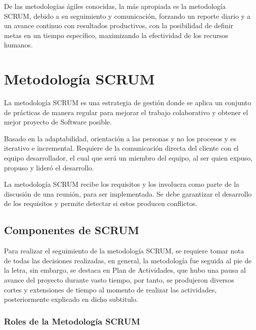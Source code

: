 De las metodologías ágiles conocidas, la más apropiada es la metodología SCRUM, debido a su seguimiento y comunicación, forzando un reporte diario y a un avance continuo con resultados productivos, con la posibilidad de definir metas en un tiempo específico, maximizando la efectividad de los recursos humanos.

\section{Metodología SCRUM}

La metodología SCRUM es una estrategia de gestión donde se aplica un conjunto de prácticas de manera regular para mejorar el trabajo colaborativo y obtener el mejor proyecto de Software posible\cite{scrumdiapo}.

Basado en la adaptabilidad, orientación a las personas y no los procesos y es iterativo e incremental. Requiere de la comunicación directa del cliente con el equipo desarrollador, el cual que será un miembro del equipo, al ser quien expuso, propuso y lideró el desarrollo.

La metodología SCRUM recibe los requisitos y los involucra como parte de la discusión de una reunión, para ser implementada. Se debe garantizar el desarrollo de los requisitos y permite detectar si estos producen conflictos.

\subsection{Componentes de SCRUM}

Para realizar el seguimiento de la metodología SCRUM, se requiere tomar nota de todas las decisiones realizadas, en general, la metodología fue seguida al pie de la letra, sin embargo, se destaca en Plan de Actividades, que hubo una pausa al avance del proyecto durante vasto tiempo, por tanto, se produjeron diversos cortes y extensiones de tiempo al momento de realizar las actividades, posteriormente explicado en dicho subtitulo.

\subsubsection{Roles de la Metodología SCRUM}

